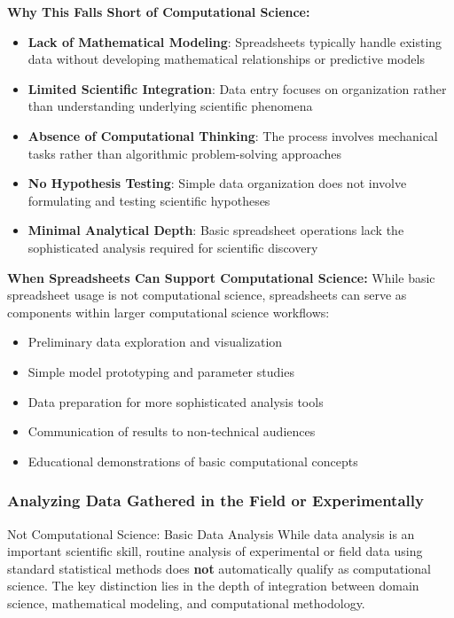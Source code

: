 \textbf{Why This Falls Short of Computational Science:}
\begin{itemize}
    \item \textbf{Lack of Mathematical Modeling}: Spreadsheets typically handle existing data without developing mathematical relationships or predictive models
    \item \textbf{Limited Scientific Integration}: Data entry focuses on organization rather than understanding underlying scientific phenomena
    \item \textbf{Absence of Computational Thinking}: The process involves mechanical tasks rather than algorithmic problem-solving approaches
    \item \textbf{No Hypothesis Testing}: Simple data organization does not involve formulating and testing scientific hypotheses
    \item \textbf{Minimal Analytical Depth}: Basic spreadsheet operations lack the sophisticated analysis required for scientific discovery
\end{itemize}

\textbf{When Spreadsheets Can Support Computational Science:}
While basic spreadsheet usage is not computational science, spreadsheets can serve as components within larger computational science workflows:
\begin{itemize}
    \item Preliminary data exploration and visualization
    \item Simple model prototyping and parameter studies
    \item Data preparation for more sophisticated analysis tools
    \item Communication of results to non-technical audiences
    \item Educational demonstrations of basic computational concepts
\end{itemize}

\subsubsection{Analyzing Data Gathered in the Field or Experimentally}

\begin{conceptcard}{Not Computational Science: Basic Data Analysis}
While data analysis is an important scientific skill, routine analysis of experimental or field data using standard statistical methods does \textbf{not} automatically qualify as computational science. The key distinction lies in the depth of integration between domain science, mathematical modeling, and computational methodology.
\end{conceptcard}

